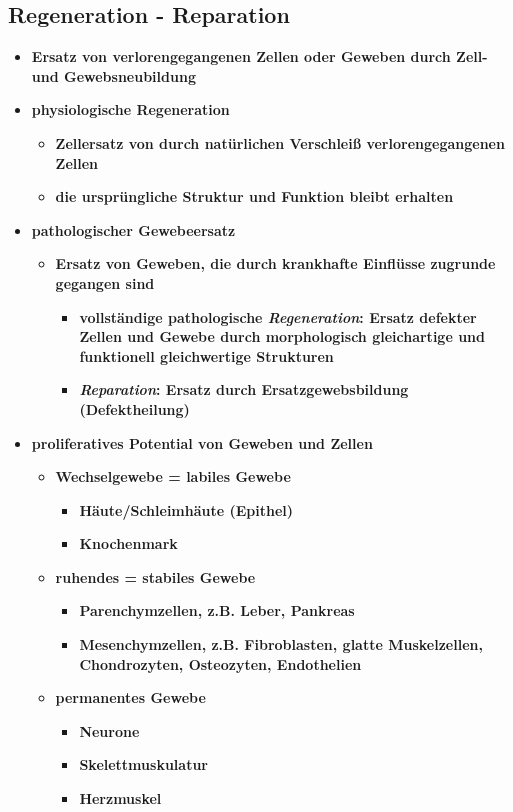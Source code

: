 \subsection{Regeneration - Reparation}
	\begin{itemize}
		\item \textbf{Ersatz von verlorengegangenen Zellen oder Geweben durch Zell- und Gewebsneubildung}
		\item \textbf{physiologische Regeneration}
			\begin{itemize}
				\item \textbf{Zellersatz von durch natürlichen Verschleiß verlorengegangenen Zellen}
				\item \textbf{die ursprüngliche Struktur und Funktion bleibt erhalten}
			\end{itemize}
		\item \textbf{pathologischer Gewebeersatz}
			\begin{itemize}
				\item \textbf{Ersatz von Geweben, die durch krankhafte Einflüsse zugrunde gegangen sind}
					\begin{itemize}
						\item \textbf{vollständige pathologische \emph{Regeneration}: Ersatz defekter Zellen und Gewebe durch morphologisch gleichartige und funktionell gleichwertige Strukturen}
						\item \textbf{\emph{Reparation}: Ersatz durch Ersatzgewebsbildung (Defektheilung)}
					\end{itemize}
			\end{itemize}
		\item \textbf{proliferatives Potential von Geweben und Zellen}
			\begin{itemize}
				\item \textbf{Wechselgewebe = labiles Gewebe}
					\begin{itemize}
						\item \textbf{Häute/Schleimhäute (Epithel)}
						\item \textbf{Knochenmark}
					\end{itemize}
				\item \textbf{ruhendes = stabiles Gewebe}
					\begin{itemize}
						\item \textbf{Parenchymzellen, z.B. Leber, Pankreas}
						\item \textbf{Mesenchymzellen, z.B. Fibroblasten, glatte Muskelzellen, Chondrozyten, Osteozyten, Endothelien}
					\end{itemize}
				\item \textbf{permanentes Gewebe}
					\begin{itemize}
						\item \textbf{Neurone}
						\item \textbf{Skelettmuskulatur}
						\item \textbf{Herzmuskel}
					\end{itemize}
			\end{itemize}
	\end{itemize}
\pagebreak
